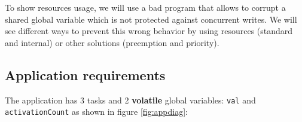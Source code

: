 \documentclass[11pt]{article}
\begin{document}
To show resources usage, we will use a bad program that allows to corrupt a shared global variable which is not protected against concurrent writes. We will see different ways to prevent this wrong behavior by using resources (standard and internal) or other solutions (preemption and priority).

\subsection{Application requirements}

The application has 3 tasks and 2 \textbf{volatile} global variables: \texttt{val} and \texttt{activationCount} as shown in figure \ref{fig:appdiag}:

\def\alarm#1#2{
  \node[alarm](#1) [#2] {};
  \coordinate (a) at ($(#1.north)$);
  \coordinate (b) at ($(#1.north east)$);
  \coordinate (c) at ($(#1.north west)$);
  \coordinate (d) at ($(#1)$);
  \draw[thick] ($(a)+(-0.1,0)$) rectangle ($(a)+(0.1,0.1)$);
  \draw[rotate=-45,thick] ($(b)+(-0.05,0)$) rectangle ($(b)+(0.05,0.1)$);
  \draw[rotate=45,thick] ($(c)+(-0.05,0)$) rectangle ($(c)+(0.05,0.1)$);
  \draw ($(d)+(0.3,0)$) -- (d) -- ($(d)+(0,0.3)$);
  \node [font=\scriptsize,below=0.5mm of #1] {{\em Alarm}}
}

\def\sharedvar#1#2#3{
  \node (#1) [#2] {#1};
  \coordinate (a) at ($(#1.north #3) + (0,0.2)$);
  \coordinate (b) at ($(#1.south #3) + (0,-0.2)$);
  \draw[ultra thick] (a) -- (b);
  \draw ($(a)+(-0.1,0)$) -- ($(a)+(0.1,0)$); 
  \draw ($(b)+(-0.1,0)$) -- ($(b)+(0.1,0)$) 
}

\def\varrect#1{
  \draw ($(#1.south west)$) rectangle ($(#1.north east)$)
}
\end{document}
